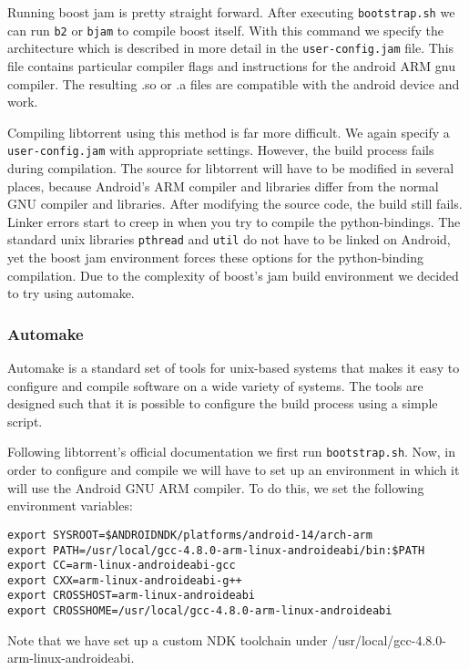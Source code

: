 		Running boost jam is pretty straight forward. After executing \texttt{bootstrap.sh} we can run \texttt{b2} or \texttt{bjam} to compile boost itself. With this command we specify the architecture which is described in more detail in the \texttt{user-config.jam} file. This file contains particular compiler flags and instructions for the android ARM gnu compiler. The resulting .so or .a files are compatible with the android device and work.
		
		Compiling libtorrent using this method is far more difficult. We again specify a \texttt{user-config.jam} with appropriate settings. However, the build process fails during compilation. The source for libtorrent will have to be modified in several places, because Android's ARM compiler and libraries differ from the normal GNU compiler and libraries. After modifying the source code, the build still fails. Linker errors start to creep in when you try to compile the python-bindings. The standard unix libraries \texttt{pthread} and \texttt{util} do not have to be linked on Android, yet the boost jam environment forces these options for the python-binding compilation. Due to the complexity of boost's jam build environment we decided to try using automake.
		
		\subsubsection{Automake}
		Automake is a standard set of tools for unix-based systems that makes it easy to configure and compile software on a wide variety of systems. The tools are designed such that it is possible to configure the build process using a simple script.
		
		Following libtorrent's official documentation we first run \texttt{bootstrap.sh}. Now, in order to configure and compile we will have to set up an environment in which it will use the Android GNU ARM compiler. To do this, we set the following environment variables:
		
		\begin{lstlisting}
export SYSROOT=$ANDROIDNDK/platforms/android-14/arch-arm
export PATH=/usr/local/gcc-4.8.0-arm-linux-androideabi/bin:$PATH
export CC=arm-linux-androideabi-gcc
export CXX=arm-linux-androideabi-g++
export CROSSHOST=arm-linux-androideabi
export CROSSHOME=/usr/local/gcc-4.8.0-arm-linux-androideabi
		\end{lstlisting}
		
		Note that we have set up a custom NDK toolchain under /usr/local/gcc-4.8.0-arm-linux-androideabi. 
		
